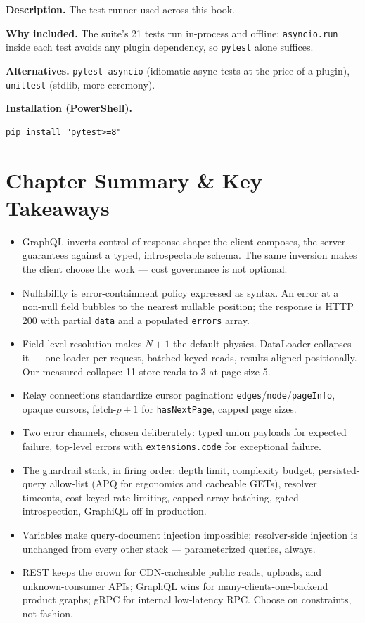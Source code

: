 \textbf{Description.} The test runner used across this book.

\textbf{Why included.} The suite's 21 tests run in-process and offline;
\texttt{asyncio.run} inside each test avoids any plugin dependency, so
\texttt{pytest} alone suffices.

\textbf{Alternatives.} \texttt{pytest-asyncio} (idiomatic async tests at
the price of a plugin), \texttt{unittest} (stdlib, more ceremony).

\textbf{Installation (PowerShell).}
\begin{verbatim}
pip install "pytest>=8"
\end{verbatim}

\section{Chapter Summary \& Key Takeaways}
\label{sec:ch12-summary}

\begin{itemize}
  \item GraphQL inverts control of response shape: the client composes,
        the server guarantees against a typed, introspectable schema. The
        same inversion makes the client choose the work --- cost
        governance is not optional.
  \item Nullability is error-containment policy expressed as syntax. An
        error at a non-null field bubbles to the nearest nullable
        position; the response is HTTP 200 with partial \texttt{data} and
        a populated \texttt{errors} array.
  \item Field-level resolution makes $N{+}1$ the default physics.
        DataLoader collapses it --- one loader per request, batched keyed
        reads, results aligned positionally. Our measured collapse: 11
        store reads to 3 at page size 5.
  \item Relay connections standardize cursor pagination:
        \texttt{edges}/\texttt{node}/\texttt{pageInfo}, opaque cursors,
        fetch-$p{+}1$ for \texttt{hasNextPage}, capped page sizes.
  \item Two error channels, chosen deliberately: typed union payloads for
        expected failure, top-level errors with \texttt{extensions.code}
        for exceptional failure.
  \item The guardrail stack, in firing order: depth limit, complexity
        budget, persisted-query allow-list (APQ for ergonomics and
        cacheable GETs), resolver timeouts, cost-keyed rate limiting,
        capped array batching, gated introspection, GraphiQL off in
        production.
  \item Variables make query-document injection impossible;
        resolver-side injection is unchanged from every other stack ---
        parameterized queries, always.
  \item REST keeps the crown for CDN-cacheable public reads, uploads, and
        unknown-consumer APIs; GraphQL wins for many-clients-one-backend
        product graphs; gRPC for internal low-latency RPC. Choose on
        constraints, not fashion.
\end{itemize}


